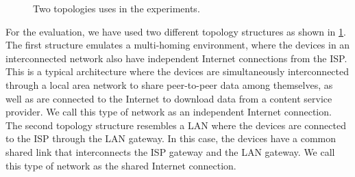 \begin{figure}[ht]
	\captionsetup[subfigure]{width=0.45\linewidth}
	\begin{center}
		\hfill
	\end{center}
	\caption{\label{fig:chap06:topologies} Two topologies uses in the experiments.}
\end{figure}

For the evaluation, we have used two different topology structures as shown in \fig\ref{fig:chap06:topologies}. The first structure emulates a multi-homing environment, where the devices in an interconnected network also have independent Internet connections from the \ac{ISP}. This is a typical architecture where the devices are simultaneously interconnected through a local area network to share peer-to-peer data among themselves, as well as are connected to the Internet to download data from a content service provider. We call this type of network as an independent Internet connection. The second topology structure resembles a \ac{LAN} where the devices are connected to the \ac{ISP} through the \ac{LAN} gateway. In this case, the devices have a common shared link that interconnects the ISP gateway and the LAN gateway. We call this type of network as the shared Internet connection.

